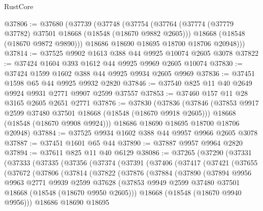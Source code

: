\begin{lexlean}{RustCore}
\begin{coremodule}
@37806 := @37680
    (@37739
      (@37748
        (@37754
          (@37764
            (@37774 (@37779 @37782) @37501 @18668 (@18548 (@18670 @9882 @2605)))
            @18668
            (@18548 (@18670 @9872 @9890)))
          @18686
          @18690
          @18695
          @18700
          @18706
          @20948)))
@37814 := @37525 @9902 @1613 @388 @44 @9925 @10074 @2605 @3078
@37822 := @37424 @1604 @393 @1612 @44 @9925 @9969 @2605 @10074
@37830 := @37424 @1599 @1602 @388 @44 @9925 @9934 @2605 @9969
@37836 := @37451 @1598 @65 @44 @9925 @9932 @2820
@37846 := @37540 @825 @11 @40 @2649 @9924 @9931 @2771 @9907 @2599 @37557
@37853 := @37460 @157 @11 @28 @3165 @2605 @2651 @2771
@37876 := @37830
    (@37836
      (@37846
        (@37853 @9917 @2599 @37480 @37501 @18668 (@18548 (@18670 @9918 @2605)))
        @18668
        (@18548 (@18670 @9908 @9924)))
      @18686
      @18690
      @18695
      @18700
      @18706
      @20948)
@37884 := @37525 @9934 @1602 @388 @44 @9957 @9966 @2605 @3078
@37887 := @37451 @1601 @65 @44
@37890 := @37887 @9957 @9964 @2820
@37894 := @37611 @825 @11 @40 @6129
@38086 := @37265
    (@37290
      (@37331
        (@37333
          (@37335
            (@37356
              (@37374
                (@37391
                  (@37406
                    (@37417
                      (@37421
                        (@37655
                          (@37672
                            (@37806
                              (@37814
                                (@37822
                                  (@37876
                                    (@37884
                                      (@37890
                                        (@37894
                                          @9956
                                          @9963
                                          @2771
                                          @9939
                                          @2599
                                          @37628
                                          (@37853
                                            @9949
                                            @2599
                                            @37480
                                            @37501
                                            @18668
                                            (@18548 (@18670 @9950 @2605)))
                                          @18668
                                          (@18548 (@18670 @9940 @9956)))
                                        @18686
                                        @18690
                                        @18695

\end{coremodule}
\end{lexlean}
